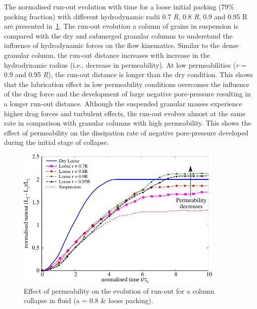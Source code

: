 The normalised run-out evolution with time for a loose initial packing (79\% 
packing fraction) with different hydrodynamic radii 0.7 \textit{R}, 0.8 
\textit{R}, 0.9 and 0.95 R are presented in~\cref{fig:Runout_a08_loose}. The 
run-out evolution a column of grains in suspension is compared with the dry and 
submerged granular columns to understand the influence of hydrodynamic forces 
on the flow kinematics. Similar to the dense granular column, the run-out 
distance increases with increase in the hydrodynamic radius (i.e., decrease in 
permeability). At low permeabilities (\textit{r} = 0.9 and 0.95 \textit{R}), 
the run-out distance is longer than the dry condition. This shows that the 
lubrication effect in low permeability conditions overcomes the influence of 
the drag force and the development of large negative pore-pressure resulting in 
a longer run-out distance. Although the suspended granular masses experience 
higher drag forces and turbulent effects, the run-out evolves almost at the 
same rate in comparison with granular columns with high permeability. This 
shows the effect of permeability on the dissipation rate of negative 
pore-pressure developed during the initial stage of collapse.

\begin{figure}
\centering
\includegraphics[width=0.9\textwidth]{Runout_a08_loose}
\caption{Effect of permeability on the evolution of run-out for a column 
collapse in fluid (a = 0.8 \& loose packing).}
\label{fig:Runout_a08_loose}
\end{figure}

